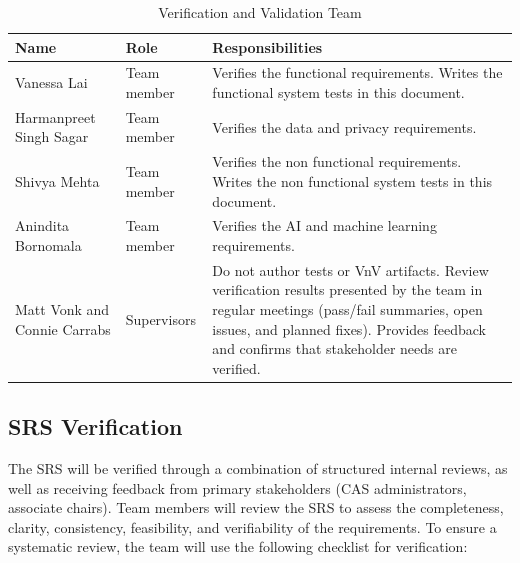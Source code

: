 \documentclass[12pt, titlepage]{article}
\begin{document}
\begin{table}[H]
\centering
\caption{Verification and Validation Team}
\label{tab:vnv-team}
\begin{tabularx}{\textwidth}{>{\raggedright\arraybackslash}p{} >{\raggedright\arraybackslash}p{} X}
\toprule
\textbf{Name} & \textbf{Role} & \textbf{Responsibilities}\\
\midrule
Vanessa Lai & Team member & Verifies the functional requirements. Writes the functional system tests in this document.\\
Harmanpreet Singh Sagar & Team member & Verifies the data and privacy requirements.\\
Shivya Mehta & Team member & Verifies the non functional requirements. Writes the non functional system tests in this document.\\
Anindita Bornomala & Team member & Verifies the AI and machine learning requirements.\\
Matt Vonk and Connie Carrabs & Supervisors & Do not author tests or VnV artifacts. Review verification results presented by the team in regular meetings (pass/fail summaries, open issues, and planned fixes). Provides feedback and confirms that stakeholder needs are verified.\\
\bottomrule
\end{tabularx}
\end{table}

\subsection{SRS Verification}




The SRS will be verified through a combination of structured internal reviews, as well as receiving 
feedback from primary stakeholders (CAS administrators, associate chairs). Team members will 
review the SRS to assess the completeness, clarity, consistency, feasibility, and verifiability 
of the requirements. To ensure a systematic review, the team will use the following checklist for 
verification:
\end{document}
